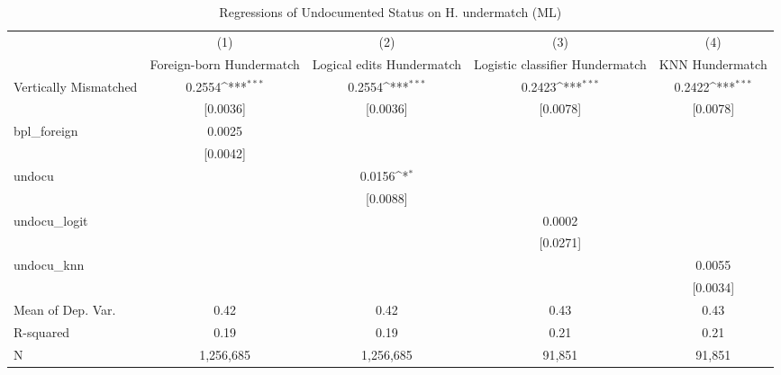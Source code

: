\begin{table}[htbp]\centering
\def\sym#1{\ifmmode^{#1}\else\(^{#1}\)\fi}
\caption{Regressions of Undocumented Status on H. undermatch (ML)}
\begin{tabular}{l*{4}{c}}
\toprule
                    &\multicolumn{1}{c}{(1)}         &\multicolumn{1}{c}{(2)}         &\multicolumn{1}{c}{(3)}         &\multicolumn{1}{c}{(4)}         \\
                    &Foreign-born Hundermatch         &Logical edits Hundermatch         &Logistic classifier Hundermatch         &KNN Hundermatch         \\
\midrule
Vertically Mismatched&      0.2554\sym{***}&      0.2554\sym{***}&      0.2423\sym{***}&      0.2422\sym{***}\\
                    &    [0.0036]         &    [0.0036]         &    [0.0078]         &    [0.0078]         \\
\addlinespace
bpl\_foreign         &      0.0025         &                     &                     &                     \\
                    &    [0.0042]         &                     &                     &                     \\
\addlinespace
undocu              &                     &      0.0156\sym{*}  &                     &                     \\
                    &                     &    [0.0088]         &                     &                     \\
\addlinespace
undocu\_logit        &                     &                     &      0.0002         &                     \\
                    &                     &                     &    [0.0271]         &                     \\
\addlinespace
undocu\_knn          &                     &                     &                     &      0.0055         \\
                    &                     &                     &                     &    [0.0034]         \\
\midrule
Mean of Dep. Var.   &        0.42         &        0.42         &        0.43         &        0.43         \\
R-squared           &        0.19         &        0.19         &        0.21         &        0.21         \\
N                   &   1,256,685         &   1,256,685         &      91,851         &      91,851         \\

\end{tabular}
\end{table}
